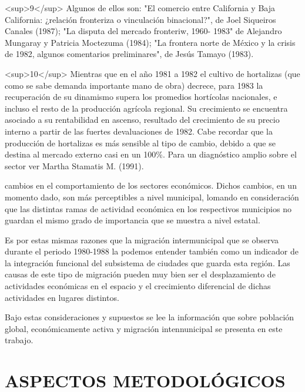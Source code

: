 \documentclass{article}
\begin{document}
<sup>9</sup> Algunos de ellos son: "El comercio entre California y Baja California: ¿relación fronteriza o vinculación binacional?", de Joel Siqueiros Canales (1987); "La disputa del mercado fronteriw, 1960- 1983" de Alejandro Mungaray y Patricia Moctezuma (1984); "La frontera norte de México y la crisis de 1982, algunos comentarios preliminares", de Jesús Tamayo (1983).

<sup>10</sup> Mientras que en el año 1981 a 1982 el cultivo de hortalizas (que como se sabe demanda importante mano de obra) decrece, para 1983 la recuperación de su dinamismo supera los promedios hortícolas nacionales, e incluso el resto de la producción agrícola regional. Su crecimiento se encuentra asociado a su rentabilidad en ascenso, resultado del crecimiento de su precio interno a partir de las fuertes devaluaciones de 1982. Cabe recordar que la producción de hortalizas es más sensible al tipo de cambio, debido a que se destina al mercado externo casi en un 100\%. Para un diagnóstico amplio sobre el sector ver Martha Stamatis M. (1991).

cambios en el comportamiento de los sectores económicos. Dichos cambios, en un momento dado, son más perceptibles a nivel municipal, lomando en consideración que las distintas ramas de actividad económica en los respectivos municipios no guardan el mismo grado de importancia que se muestra a nivel estatal.

Es por estas mismas razones que la migración intermunicipal que se observa durante el periodo 1980-1988 la podemos entender también como un indicador de la integración funcional del subsistema de ciudades que guarda esta región. Las causas de este tipo de migración pueden muy bien ser el desplazamiento de actividades económicas en el espacio y el crecimiento diferencial de dichas actividades en lugares distintos.

Bajo estas consideraciones y supuestos se lee la información que sobre población global, económicamente activa y migración intennunicipal se presenta en este trabajo.

\section{\textbf{ASPECTOS METODOLÓGICOS}}
\end{document}
